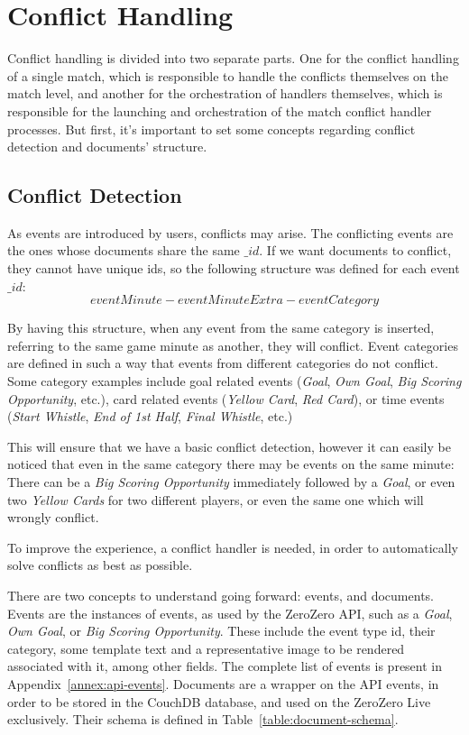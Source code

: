 \section{Conflict Handling}

Conflict handling is divided into two separate parts. One for the conflict handling of a single match, which is responsible to handle the conflicts themselves on the match level, and another for the orchestration of handlers themselves, which is responsible for the launching and orchestration of the match conflict handler processes. But first, it's important to set some concepts regarding conflict detection and documents' structure.

\subsection{Conflict Detection}

As events are introduced by users, conflicts may arise. The conflicting events are the ones whose documents share the same $\_id$. If we want documents to conflict, they cannot have unique ids, so the following structure was defined for each event $\_id$:
\begin{equation}
    eventMinute-eventMinuteExtra-eventCategory
\end{equation}

By having this structure, when any event from the same category is inserted, referring to the same game minute as another, they will conflict. Event categories are defined in such a way that events from different categories do not conflict. Some category examples include goal related events (\textit{Goal}, \textit{Own Goal}, \textit{Big Scoring Opportunity}, etc.), card related events (\textit{Yellow Card}, \textit{Red Card}), or time events (\textit{Start Whistle}, \textit{End of 1st Half}, \textit{Final Whistle}, etc.)

This will ensure that we have a basic conflict detection, however it can easily be noticed that even in the same category there may be events on the same minute: There can be a \textit{Big Scoring Opportunity} immediately followed by a \textit{Goal}, or even two \textit{Yellow Cards} for two different players, or even the same one which will wrongly conflict.

To improve the experience, a conflict handler is needed, in order to automatically solve conflicts as best as possible.

There are two concepts to understand going forward: events, and documents. Events are the instances of events, as used by the ZeroZero API, such as a \textit{Goal}, \textit{Own Goal}, or \textit{Big Scoring Opportunity}. These include the event type id, their category, some template text and a representative image to be rendered associated with it, among other fields. The complete list of events is present in Appendix~\ref{annex:api-events}. Documents are a wrapper on the API events, in order to be stored in the CouchDB database, and used on the ZeroZero Live exclusively. Their schema is defined in Table~\ref{table:document-schema}.


